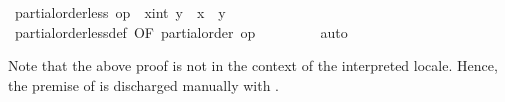 \begin{isabellebody}
\ {\isachardoublequoteopen}partial{\isacharunderscore}order{\isachardot}less\ op\ {\isasymle}\ {\isacharparenleft}x{\isacharcolon}{\isacharcolon}int{\isacharparenright}\ y\ {\isacharequal}\ {\isacharparenleft}x\ {\isacharless}\ y{\isacharparenright}{\isachardoublequoteclose}\isanewline
\ \ \ \ \ \ \isamarkupfalse%
\ partial{\isacharunderscore}order{\isachardot}less{\isacharunderscore}def\ {\isacharbrackleft}OF\ {\isacharbackquoteopen}partial{\isacharunderscore}order\ op\ {\isasymle}{\isacharbackquoteclose}{\isacharbrackright}\isanewline
\ \ \ \ \ \ \isamarkupfalse%
\ auto\isanewline
\ \ \isamarkupfalse%
%
\endisatagvisible
{\isafoldvisible}%
%
\isadelimvisible
%
\endisadelimvisible
%
\begin{isamarkuptext}%
Note that the above proof is not in the context of the
  interpreted locale.  Hence, the premise of  is discharged manually with .%
\end{isamarkuptext}%
\isamarkuptrue%
%
\isadelimtheory
%
\endisadelimtheory
%
\isatagtheory
{}\isamarkupfalse%
%
\endisatagtheory
{\isafoldtheory}%
%
\isadelimtheory
%
\endisadelimtheory
\isanewline
\end{isabellebody}%
